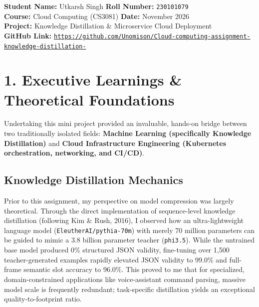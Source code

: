 \documentclass[10pt,a4paper]{article}
\begin{document}
\begin{tcolorbox}[colback=gray!5,colframe=gray!60,title=\textbf{CS3081: Cloud Computing Mini Project --- Personal Reflection Notes}]
\textbf{Student Name:} Utkarsh Singh \hfill \textbf{Roll Number:} \texttt{230101079}\\
\textbf{Course:} Cloud Computing (CS3081) \hfill \textbf{Date:} November 2026\\
\textbf{Project:} Knowledge Distillation \& Microservice Cloud Deployment\\
\textbf{GitHub Link:} \href{https://github.com/Unomison/Cloud-computing-assignment-knowledge-distillation-}{\footnotesize\texttt{https://github.com/Unomison/Cloud-computing-assignment-knowledge-distillation-}}
\end{tcolorbox}

\vspace{0.1cm}
\section*{1. Executive Learnings \& Theoretical Foundations}

Undertaking this mini project provided an invaluable, hands-on bridge between two traditionally isolated fields: \textbf{Machine Learning (specifically Knowledge Distillation)} and \textbf{Cloud Infrastructure Engineering (Kubernetes orchestration, networking, and CI/CD)}.

\subsection*{Knowledge Distillation Mechanics}
Prior to this assignment, my perspective on model compression was largely theoretical. Through the direct implementation of sequence-level knowledge distillation (following Kim \& Rush, 2016), I observed how an ultra-lightweight language model (\texttt{EleutherAI/pythia-70m}) with merely 70 million parameters can be guided to mimic a 3.8 billion parameter teacher (\texttt{phi3.5}). While the untrained base model produced 0\% structured JSON validity, fine-tuning over 1,500 teacher-generated examples rapidly elevated JSON validity to 99.0\% and full-frame semantic slot accuracy to 96.0\%. This proved to me that for specialized, domain-constrained applications like voice-assistant command parsing, massive model scale is frequently redundant; task-specific distillation yields an exceptional quality-to-footprint ratio.
\end{document}
